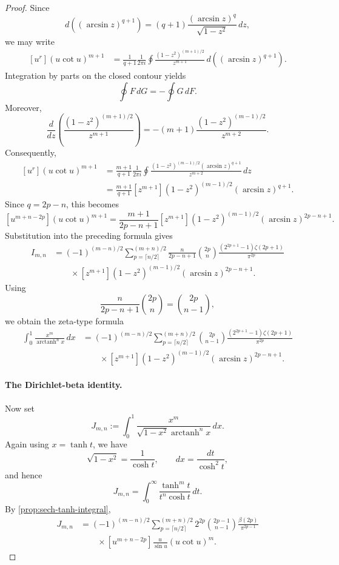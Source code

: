 \documentclass[11pt,twoside]{article}
\numberwithin{equation}{section}
\begin{document}
\begin{proof}
Since
\[
d\!\left((\arcsin z)^{q+1}\right)
=
(q+1)
\frac{(\arcsin z)^q}{\sqrt{1-z^2}}\,dz,
\]
we may write
\[
\begin{aligned}
[u^r](u\cot u)^{m+1}
&=
\frac{1}{q+1}
\frac{1}{2\pi i}
\oint
\frac{(1-z^2)^{(m+1)/2}}{z^{m+1}}
\,d\!\left((\arcsin z)^{q+1}\right).
\end{aligned}
\]
Integration by parts on the closed contour yields
\[
\oint F\,dG=-\oint G\,dF.
\]
Moreover,
\[
\frac{d}{dz}
\left(
\frac{(1-z^2)^{(m+1)/2}}{z^{m+1}}
\right)
=
-(m+1)
\frac{(1-z^2)^{(m-1)/2}}{z^{m+2}}.
\]
Consequently,
\[
\begin{aligned}
[u^r](u\cot u)^{m+1}
&=
\frac{m+1}{q+1}
\frac{1}{2\pi i}
\oint
\frac{
(1-z^2)^{(m-1)/2}
(\arcsin z)^{q+1}
}{
z^{m+2}
}\,dz
\\
&=
\frac{m+1}{q+1}
[z^{m+1}]
(1-z^2)^{(m-1)/2}
(\arcsin z)^{q+1}.
\end{aligned}
\]
Since $q=2p-n$, this becomes
\[
\boxed{
[u^{m+n-2p}](u\cot u)^{m+1}
=
\frac{m+1}{2p-n+1}
[z^{m+1}]
(1-z^2)^{(m-1)/2}
(\arcsin z)^{2p-n+1}.
}
\]
Substitution into the preceding formula gives
\[
\begin{aligned}
I_{m,n}
&=
(-1)^{(m-n)/2}
\sum_{p=\lceil n/2\rceil}^{(m+n)/2}
\frac{n}{2p-n+1}
\binom{2p}{n}
\frac{(2^{2p+1}-1)\zeta(2p+1)}
{\pi^{2p}}
\\
&\qquad\times
[z^{m+1}]
(1-z^2)^{(m-1)/2}
(\arcsin z)^{2p-n+1}.
\end{aligned}
\]
Using
\[
\frac{n}{2p-n+1}\binom{2p}{n}
=
\binom{2p}{n-1},
\]
we obtain the zeta-type formula
\begin{equation}
\label{eq:arctanh-zeta-type}
\boxed{
\begin{aligned}
\int_0^1
\frac{x^m}{\operatorname{arctanh}^n x}\,dx
&=
(-1)^{(m-n)/2}
\sum_{p=\lceil n/2\rceil}^{(m+n)/2}
\binom{2p}{n-1}
\frac{(2^{2p+1}-1)\zeta(2p+1)}
{\pi^{2p}}
\\
&\qquad\times
[z^{m+1}]
(1-z^2)^{(m-1)/2}
(\arcsin z)^{2p-n+1}.
\end{aligned}
}
\end{equation}

\paragraph{The Dirichlet-beta identity.}
Now set
\[
J_{m,n}
:=
\int_0^1
\frac{x^m}
{\sqrt{1-x^2}\operatorname{arctanh}^n x}\,dx.
\]
Again using $x=\tanh t$, we have
\[
\sqrt{1-x^2}
=
\frac{1}{\cosh t},
\qquad
dx=\frac{dt}{\cosh^2 t},
\]
and hence
\[
J_{m,n}
=
\int_0^\infty
\frac{\tanh^m t}{t^n\cosh t}\,dt.
\]
By \cref{prop:sech-tanh-integral},
\[
\begin{aligned}
J_{m,n}
&=
(-1)^{(m-n)/2}
\sum_{p=\lceil n/2\rceil}^{(m+n)/2}
2^{2p}
\binom{2p-1}{n-1}
\frac{\beta(2p)}{\pi^{2p-1}}
\\
&\qquad\times
[u^{m+n-2p}]
\frac{u}{\sin u}(u\cot u)^m.
\end{aligned}
\]


\end{proof}
\end{document}

